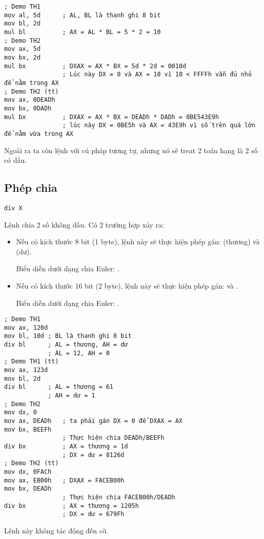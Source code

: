 \documentclass[main.tex]{subfiles}
\begin{document}
\begin{verbatim}
; Demo TH1 
mov al, 5d      ; AL, BL là thanh ghi 8 bit
mov bl, 2d 
mul bl          ; AX = AL * BL = 5 * 2 = 10
; Demo TH2 
mov ax, 5d 
mov bx, 2d 
mul bx          ; DXAX = AX * BX = 5d * 2d = 0010d
                ; Lúc này DX = 0 và AX = 10 vì 10 < FFFFh vẫn đủ nhỏ để nằm trong AX
; Demo TH2 (tt)
mov ax, 0DEADh
mov bx, 0DADh
mul bx          ; DXAX = AX * BX = DEADh * DADh = 0BE543E9h
                ; lúc này DX = 0BE5h và AX = 43E9h vì số trên quá lớn để nằm vừa trong AX
\end{verbatim}

Ngoài ra ta còn lệnh  với cú pháp tương tự, nhưng nó sẽ treat 2 toán hạng là 2 số có dấu.

\subsection{Phép chia} \label{subsec:phepchia}
\begin{verbatim}
div X
\end{verbatim}
Lệnh  chia 2 số không dấu.
Có 2 trường hợp xảy ra:
\begin{itemize}
    \item Nếu  có kích thước 8 bit (1 byte), lệnh này sẽ thực hiện phép gán:  (thương) và  (dư).  
    \par Biểu diễn dưới dạng chia Euler: .
    \item Nếu  có kích thước 16 bit (2 byte), lệnh này sẽ thực hiện phép gán:  và .
    \par Biểu diễn dưới dạng chia Euler: .
\end{itemize} 
\begin{verbatim}
; Demo TH1 
mov ax, 120d
mov bl, 10d ; BL là thanh ghi 8 bit 
div bl      ; AL = thương, AH = dư 
            ; AL = 12, AH = 0
; Demo TH1 (tt)
mov ax, 123d 
mov bl, 2d 
div bl      ; AL = thương = 61 
            ; AH = dư = 1
; Demo TH2 
mov dx, 0
mov ax, DEADh   ; ta phải gán DX = 0 để DXAX = AX 
mov bx, BEEFh 
                ; Thực hiện chia DEADh/BEEFh
div bx          ; AX = thương = 1d
                ; DX = dư = 8126d
; Demo TH2 (tt)
mov dx, 0FACh
mov ax, EB00h   ; DXAX = FACEB00h
mov bx, DEADh 
                ; Thực hiện chia FACEB00h/DEADh
div bx          ; AX = thương = 1205h
                ; DX = dư = 679Fh

\end{verbatim}
Lệnh này không tác động đến cờ.
\end{document}
